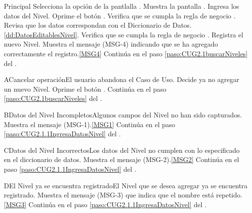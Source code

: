 	\begin{UCtrayectoria}{Principal}
			\UCpaso[\UCactor] Selecciona la opción  de la pantlalla .
			\UCpaso Muestra la pantalla .
			\UCpaso [\UCactor] Ingresa los datos del Nivel. \label{paso:CUG2.1.1IngresaDatosNivel}
			\UCpaso [\UCactor] Oprime el botón .
			\UCpaso Verifica que se cumpla la regla de negocio .  
			\UCpaso Revisa que los datos correspondan con el Diccionario de Datos. \ref{dd:DatosEditablesNivel}. 
			\UCpaso Verifica que se cumpla la regla de negocio .  
			\UCpaso Registra el nuevo Nivel.
			\UCpaso Muestra el mensaje (MSG-4) indicando que se ha agregado correctamente el registro.\ref{MSG4}
			\UCpaso Continúa en el paso \ref{paso:CUG2.1buscarNiveles} del .
	\end{UCtrayectoria}

	\begin{UCtrayectoriaA}{A}{Cancelar operación}{El usuario abandona el Caso de Uso.}
			\UCpaso[\UCactor] Decide ya no agregar un nuevo Nivel.
			\UCpaso[\UCactor] Oprime el botón .
			\UCpaso Continúa en el paso \ref{paso:CUG2.1buscarNiveles} del .
	\end{UCtrayectoriaA}
		
	\begin{UCtrayectoriaA}{B}{Datos del Nivel Incompletos}{Algunos campos del Nivel no han sido capturados.}
			\UCpaso Muestra el mensaje (MSG-1).\ref{MSG1}
			\UCpaso Continúa en el paso \ref{paso:CUG2.1.1IngresaDatosNivel} del .
	\end{UCtrayectoriaA}

	\begin{UCtrayectoriaA}{C}{Datos del Nivel Incorrectos}{Los datos del Nivel no cumplen con lo especificado en el diccionario de datos.}
			\UCpaso Muestra el mensaje (MSG-2).\ref{MSG2}
			\UCpaso Continúa en el paso \ref{paso:CUG2.1.1IngresaDatosNivel} del .
	\end{UCtrayectoriaA}

		\begin{UCtrayectoriaA}{D}{El Nivel ya se encuentra registrado}{El Nivel que se desea agregar ya se encuentra registrado.}
			\UCpaso Muestra el mensaje (MSG-3) que indica que el nombre está repetido.\ref{MSG3}
			\UCpaso Continúa en el paso \ref{paso:CUG2.1.1IngresaDatosNivel} del .
		\end{UCtrayectoriaA}

